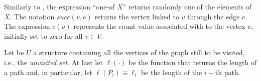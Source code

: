 Similarly to \cite{koenig2001}, the expression ``one-of $X$'' returns randomly one of the elements of $X$. The notation $succ(v,e)$ returns the vertex linked to $v$ through the edge $e$. The expression $c(v)$ represents the count value associated with to the vertex $v$, initially set to zero for all $v \in V$.

Let be $U$ a structure containing all the vertices of the graph still to be visited, i.e., the \emph{unvisited set}. At last let $\ell(\cdot)$ be the function that returns the length of a path and, in particular, let $\ell(P_i) \equiv \ell_i$ be the length of the $i-$th path.





